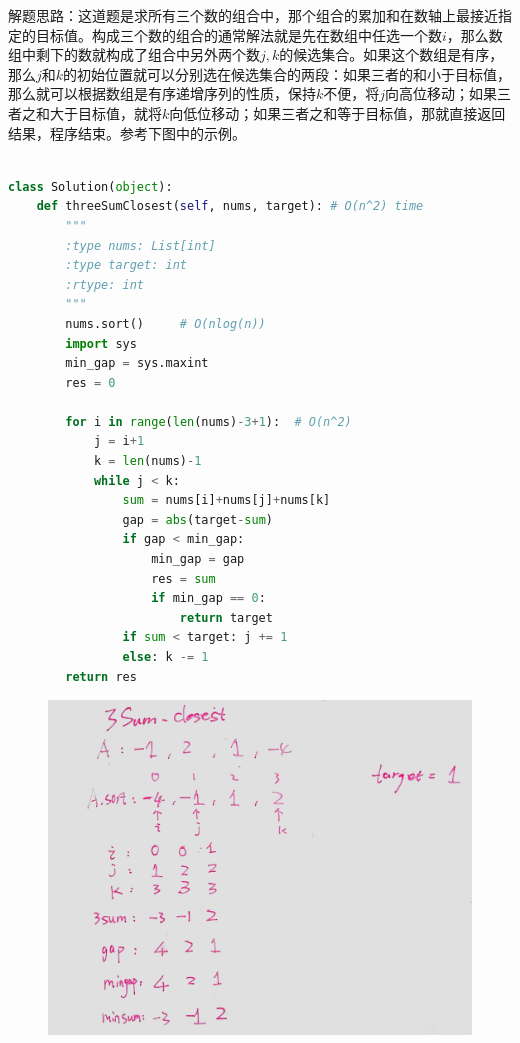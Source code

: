 \documentclass[a4paper,10pt]{article}
\begin{document}
\begin{CJK*}{UTF8}{gbsn}
\noindent 解题思路：这道题是求所有三个数的组合中，那个组合的累加和在数轴上最接近指定的目标值。构成三个数的组合的通常解法就是先在数组中任选一个数$i$，那么数组中剩下的数就构成了组合中另外两个数$j,k$的候选集合。如果这个数组是有序，那么$j$和$k$的初始位置就可以分别选在候选集合的两段：如果三者的和小于目标值，那么就可以根据数组是有序递增序列的性质，保持$k$不便，将$j$向高位移动；如果三者之和大于目标值，就将$k$向低位移动；如果三者之和等于目标值，那就直接返回结果，程序结束。参考下图中的示例。\\
\end{CJK*}


\begin{lstlisting}[language=Python, caption=Problem16. 3Sum Closest]

class Solution(object):
    def threeSumClosest(self, nums, target): # O(n^2) time
        """
        :type nums: List[int]
        :type target: int
        :rtype: int
        """
        nums.sort()     # O(nlog(n))
        import sys
        min_gap = sys.maxint
        res = 0

        for i in range(len(nums)-3+1):  # O(n^2)
            j = i+1
            k = len(nums)-1
            while j < k:
                sum = nums[i]+nums[j]+nums[k]
                gap = abs(target-sum)
                if gap < min_gap:
                    min_gap = gap
                    res = sum
                    if min_gap == 0:
                        return target
                if sum < target: j += 1
                else: k -= 1
        return res
\end{lstlisting}

\begin{figure}[h]
    \includegraphics[width=\textwidth]{leetcode16.jpg}
    \centering \\
\end{figure}
\end{document}
